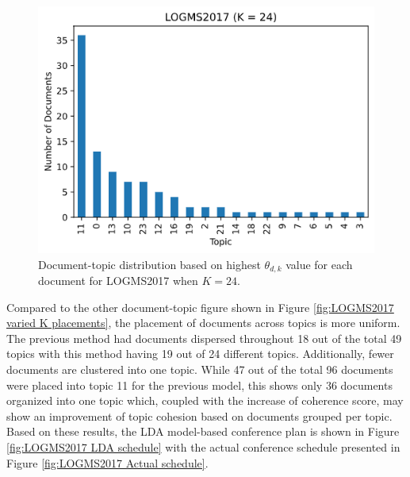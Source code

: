 \documentclass[a4paper, 12pt, twoside]{article}
\numberwithin{equation}{section} %
\begin{document}
\begin{figure}[H]

  \centering
  \includegraphics[width=0.65\linewidth]{LOGMS_placement_fixedK.png}
\caption[TSL2018 conference K document-topic distribution]{Document-topic distribution based on highest $\theta_{d,k}$ value for each document for LOGMS2017 when $K=24$.}
\label{fig:LOGMS fixed K placements}
\end{figure}

Compared to the other document-topic figure shown in Figure \ref{fig:LOGMS2017 varied K placements}, the placement of documents across topics is more uniform. The previous method had documents dispersed throughout 18 out of the total 49 topics with this method having 19 out of 24 different topics. Additionally, fewer documents are clustered into one topic. While 47 out of the total 96 documents were placed into topic 11 for the previous model, this shows only 36 documents organized into one topic which, coupled with the increase of coherence score, may show an improvement of topic cohesion based on documents grouped per topic. Based on these results, the LDA model-based conference plan is shown in Figure \ref{fig:LOGMS2017 LDA schedule} with the actual conference schedule presented in Figure \ref{fig:LOGMS2017 Actual schedule}.
\end{document}
